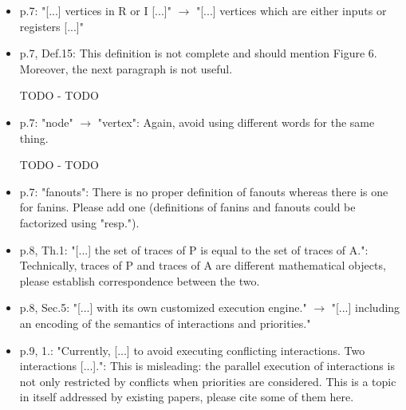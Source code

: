 \begin{itemize}
\item p.7: "[...] vertices in R or I [...]" $\rightarrow$ "[...] vertices which are either 
inputs or registers [...]"
\done
\item p.7, Def.15: This definition is not complete and should mention Figure 6. 
Moreover, the next paragraph is not useful.


TODO - TODO


\item p.7: "node" $\rightarrow$ "vertex": Again, avoid using different words for the same 
thing.

TODO - TODO

\item p.7: "fanouts": There is no proper definition of fanouts whereas there is 
one for fanins. Please add one (definitions of fanins and fanouts could be 
factorized using "resp.").
\done
{}

\item p.8, Th.1: "[...] the set of traces of P is equal to the set of traces of 
A.": Technically, traces of P and traces of A are different mathematical 
objects, please establish correspondence between the two.
\done
{}

\item p.8, Sec.5: "[...] with its own customized execution engine." $\rightarrow$ "[...] 
including an encoding of the semantics of interactions and priorities."
\done 
\item p.9, 1.: "Currently, [...] to avoid executing conflicting interactions. Two 
interactions [...].": This is misleading: the parallel execution of 
interactions is not only restricted by conflicts when priorities are 
considered. This is a topic in itself addressed by existing papers, please 
cite some of them here.
\done


\end{itemize}
